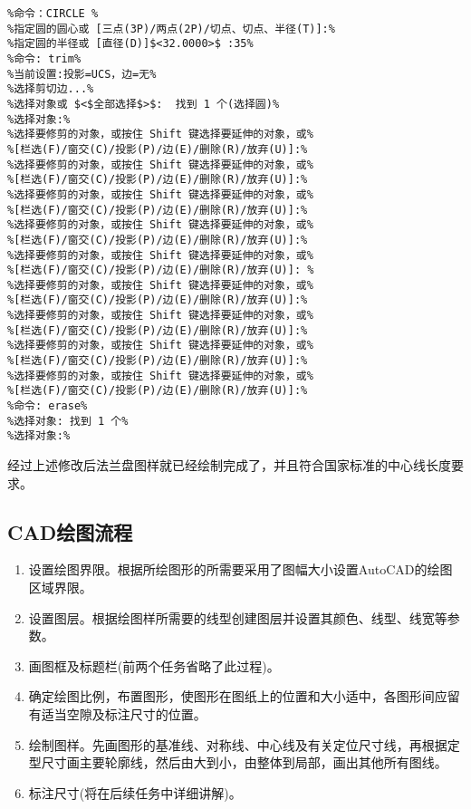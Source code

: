 \begin{lstlisting}
%命令：CIRCLE %
%指定圆的圆心或 [三点(3P)/两点(2P)/切点、切点、半径(T)]:%
%指定圆的半径或 [直径(D)]$<32.0000>$ :35%
%命令: trim%
%当前设置:投影=UCS，边=无%
%选择剪切边...%
%选择对象或 $<$全部选择$>$:  找到 1 个(选择圆)%
%选择对象:%
%选择要修剪的对象，或按住 Shift 键选择要延伸的对象，或%
%[栏选(F)/窗交(C)/投影(P)/边(E)/删除(R)/放弃(U)]:%
%选择要修剪的对象，或按住 Shift 键选择要延伸的对象，或%
%[栏选(F)/窗交(C)/投影(P)/边(E)/删除(R)/放弃(U)]:%
%选择要修剪的对象，或按住 Shift 键选择要延伸的对象，或%
%[栏选(F)/窗交(C)/投影(P)/边(E)/删除(R)/放弃(U)]:%
%选择要修剪的对象，或按住 Shift 键选择要延伸的对象，或%
%[栏选(F)/窗交(C)/投影(P)/边(E)/删除(R)/放弃(U)]:%
%选择要修剪的对象，或按住 Shift 键选择要延伸的对象，或%
%[栏选(F)/窗交(C)/投影(P)/边(E)/删除(R)/放弃(U)]: %
%选择要修剪的对象，或按住 Shift 键选择要延伸的对象，或%
%[栏选(F)/窗交(C)/投影(P)/边(E)/删除(R)/放弃(U)]:%
%选择要修剪的对象，或按住 Shift 键选择要延伸的对象，或%
%[栏选(F)/窗交(C)/投影(P)/边(E)/删除(R)/放弃(U)]:%
%选择要修剪的对象，或按住 Shift 键选择要延伸的对象，或%
%[栏选(F)/窗交(C)/投影(P)/边(E)/删除(R)/放弃(U)]:%
%选择要修剪的对象，或按住 Shift 键选择要延伸的对象，或%
%[栏选(F)/窗交(C)/投影(P)/边(E)/删除(R)/放弃(U)]:%
%命令: erase%
%选择对象: 找到 1 个%
%选择对象:%
\end{lstlisting}
\indent
经过上述修改后法兰盘图样就已经绘制完成了，并且符合国家标准的中心线长度要求。
\subsection{CAD绘图流程}
\begin{enumerate}
\item 设置绘图界限。根据所绘图形的所需要采用了图幅大小设置AutoCAD的绘图区域界限。
\item 设置图层。根据绘图样所需要的线型创建图层并设置其颜色、线型、线宽等参数。
\item 画图框及标题栏(前两个任务省略了此过程)。
\item 确定绘图比例，布置图形，使图形在图纸上的位置和大小适中，各图形间应留有适当空隙及标注尺寸的位置。
\item 绘制图样。先画图形的基准线、对称线、中心线及有关定位尺寸线，再根据定型尺寸画主要轮廓线，然后由大到小，由整体到局部，画出其他所有图线。
\item 标注尺寸(将在后续任务中详细讲解)。
\end{enumerate}
